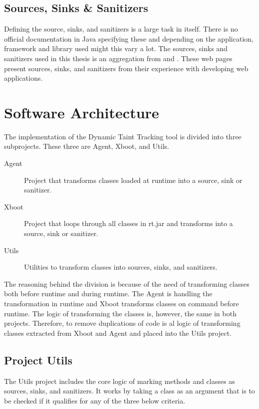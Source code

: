 \subsection{Sources, Sinks \& Sanitizers}
Defining the source, sinks, and sanitizers is a large task in itself. There is no official documentation in Java specifying these and depending on the application, framework and library used might this vary a lot.  The sources, sinks and sanitizers used in this thesis is an aggregation from \textcite{sssCodeMaster} and \textcite{sssOWASP}. These web pages present sources, sinks, and sanitizers from their experience with developing web applications. 



\section{Software Architecture}
\label{SoftwareArchitecture}
The implementation of the Dynamic Taint Tracking tool is divided into three subprojects. These three are Agent, Xboot, and Utils. 

\hfill
\begin{description}
    \item[Agent] Project that transforms classes loaded at runtime into a source, sink or sanitizer.
    \item[Xboot] Project that loops through all classes in rt.jar and transforms into a source, sink or sanitizer.
    \item[Utils] Utilities to transform classes into sources, sinks, and sanitizers. 
\end{description}
\hfill

The reasoning behind the division is because of the need of transforming classes both before runtime and during runtime. The Agent is handling the transformation in runtime and Xboot transforms classes on command before runtime. The logic of transforming the classes is, however, the same in both projects. Therefore, to remove duplications of code is al logic of transforming classes extracted from Xboot and Agent and placed into the Utils project.



\subsection{Project Utils}
The Utils project includes the core logic of marking methods and classes as sources, sinks, and sanitizers. It works by taking a class as an argument that is to be checked if it qualifies for any of the three below criteria.

